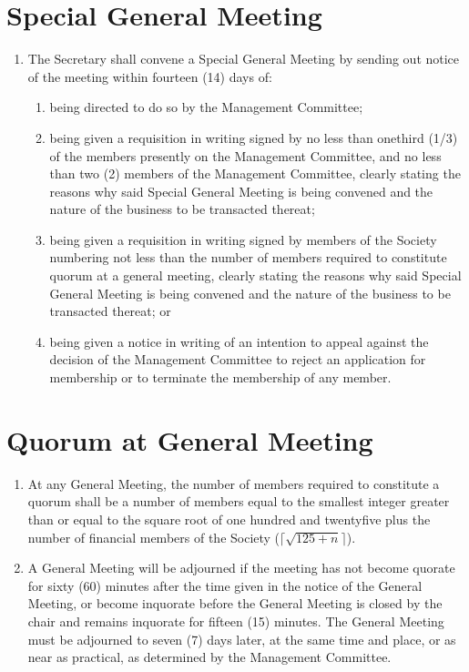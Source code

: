 \documentclass[a4paper]{article}
\begin{document}
\section{Special General Meeting}
\begin{enumerate}
\item The Secretary shall convene a Special General Meeting by sending out notice of the meeting within fourteen (14) days of:
	\begin{enumerate}
	\item being directed to do so by the Management Committee;
	\item being given a requisition in writing signed by no less than one\textendash third (1/3) of the members presently on the Management Committee, and no less than two (2) members of the Management Committee, clearly stating the reasons why said Special General Meeting is being convened and the nature of the business to be transacted thereat;
	\item being given a requisition in writing signed by members of the Society numbering not less than the number of members required to constitute quorum at a general meeting, clearly stating the reasons why said Special General Meeting is being convened and the nature of the business to be transacted thereat; or
	\item being given a notice in writing of an intention to appeal against the decision of the Management Committee to reject an application for membership or to terminate the membership of any member.
	\end{enumerate}
\end{enumerate}

\section{Quorum at General Meeting}
\begin{enumerate}
\item At any General Meeting, the number of members required to constitute a quorum shall be a number of members equal to the smallest integer greater than or equal to the square root of one hundred and twenty\textendash five plus the number of financial members of the Society ($\Big\lceil\sqrt{125+n}\Big\rceil$).
\item A General Meeting will be adjourned if the meeting has not become quorate for sixty (60) minutes after the time given in the notice of the General Meeting, or become inquorate before the General Meeting is closed by the chair and remains inquorate for fifteen (15) minutes. The General Meeting must be adjourned to seven (7) days later, at the same time and place, or as near as practical, as determined by the Management Committee.
\end{enumerate}
\end{document}
